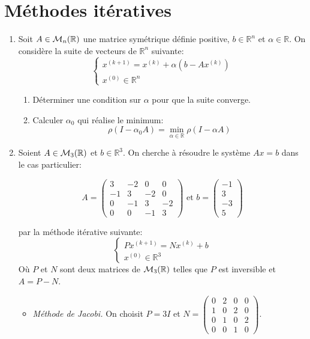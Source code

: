 \documentclass[a4paper]{article}
\begin{document}
\section{Méthodes itératives}
\begin{enumerate}
\item Soit $A\in {\cal M}_n(\mathbb{R})$ une matrice symétrique définie positive, $b\in\mathbb{R}^n$ et $\alpha\in\mathbb{R}$. On considère la suite de vecteurs de $\mathbb{R}^n$ suivante:
\[\left\{\begin{array}{l}
x^{(k+1)}=x^{(k)}+\alpha(b-Ax^{(k)})\\
x^{(0)}\in\mathbb{R}^n

\end{array}\right.
\]
\begin{enumerate}
\item Déterminer une condition sur $\alpha$ pour que la suite converge.
\item Calculer $\alpha_0$ qui réalise le minimum:
\[\rho(I-\alpha_0A)=\min_{\alpha\in\mathbb{R}}\rho(I-\alpha A)\]

\end{enumerate}

\item Soient $A\in {\cal M}_3(\mathbb{R})$ et $b\in\mathbb{R}^3$. On cherche à résoudre le système $Ax=b$ dans le cas particulier:

\[A=\left(\begin{array}{cccc}
3& -2& 0& 0\\
-1& 3& -2& 0\\
0& -1& 3& -2\\
0& 0& -1& 3
\end{array}\right)
\mbox{ et }b=\left(\begin{array}{c}
-1\\3\\-3\\5 
\end{array}\right)
\] 

par la méthode itérative suivante:
\[\left\{\begin{array}{l}P x^{(k+1)}=N x^{(k)}+b\\x^{(0)}\in \mathbb{R}^3\end{array}\right.\]
 Où $P$ et $N$ sont deux matrices de ${\cal M}_3(\mathbb{R})$ telles que $P$ est inversible et  $A=P-N$. 
\begin{itemize}
\item {\it Méthode de Jacobi.} On choisit $P=3 I$ et 
$N=\left(\begin{array}{cccc}
0& 2& 0& 0\\
1& 0& 2& 0\\
0& 1& 0& 2\\
0& 0& 1& 0
\end{array}\right)$. 


\end{itemize}
\end{enumerate}
\end{document}
